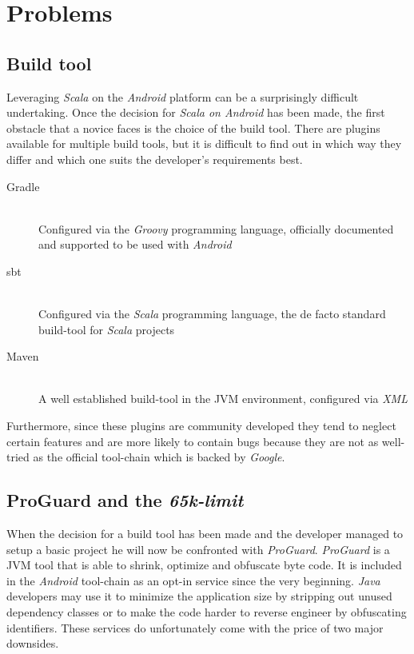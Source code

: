 \section{Problems}

\subsection{Build tool}

Leveraging \textit{Scala} on the \textit{Android} platform can be a surprisingly difficult undertaking. Once the decision for \textit{Scala on Android} has been made, the  first obstacle that a novice faces is the choice of the build tool. There are plugins available for multiple build tools, but it is difficult to find out in which way they differ and which one suits the developer's requirements best.

\begin{description}

	\item[Gradle]\hfill \\
	Configured via the \textit{Groovy} programming language, officially documented and supported to be used with \textit{Android}

	\item[\ac{sbt}]\hfill \\
	Configured via the \textit{Scala} programming language, the de facto standard build-tool for \textit{Scala} projects

	\item[Maven]\hfill \\
	A well established build-tool in the \ac{JVM} environment, configured via \textit{XML}

\end{description}

Furthermore, since these plugins are community developed they tend to neglect certain features and are more likely to contain bugs because they are not as well-tried as the official tool-chain which is backed by \textit{Google}.

\subsection{ProGuard and the \textit{65k-limit}}

When the decision for a build tool has been made and the developer managed to setup a basic project he will now be confronted with \textit{ProGuard}. \textit{ProGuard} is a \ac{JVM} tool that is able to shrink, optimize and obfuscate byte code. It is included in the \textit{Android} tool-chain as an opt-in service since the very beginning. \textit{Java} developers may use it to minimize the application size by stripping out unused dependency classes or to make the code harder to reverse engineer by obfuscating identifiers. These services do unfortunately come with the price of two major downsides.

